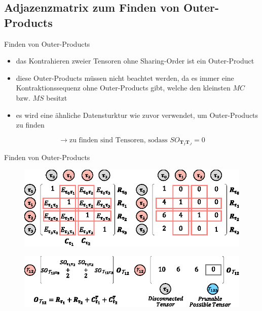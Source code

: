\documentclass{beamer}
\begin{document}
			\subsection{Adjazenzmatrix zum Finden von Outer-Products}
			\begin{frame}{Finden von Outer-Products}
				\begin{itemize}
					\item das Kontrahieren zweier Tensoren ohne Sharing-Order ist ein Outer-Product
					\item diese Outer-Products müssen nicht beachtet werden, da es immer eine Kontraktionssequenz ohne Outer-Products gibt, welche den kleinsten $MC$ bzw. $MS$ besitzt\cite{outerProduct}
					\item es wird eine ähnliche Datensturktur wie zuvor verwendet, um Outer-Products zu finden
				\end{itemize} \pause
				\begin{equation*}
					\rightarrow \text{zu finden sind Tensoren, sodass } SO_{\bm{T}_I \bm{T}_J} = 0
				\end{equation*}
			\end{frame}

			\begin{frame}{Finden von Outer-Products}
				\begin{figure}
					\includegraphics[scale=1.1]{figure_05_e_g}
				\end{figure} \pause
				\begin{figure}
					\includegraphics[scale=1.2]{figure_05_f_h}
				\end{figure}
			\end{frame}
\end{document}
